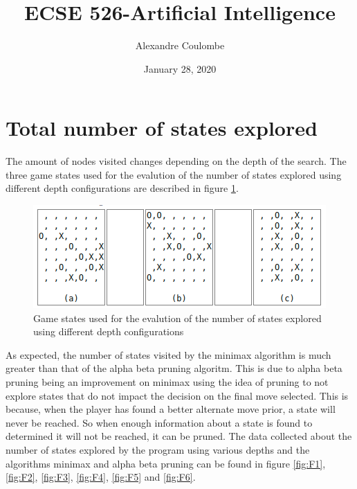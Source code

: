 \documentclass[11pt]{article}
\begin{document}
\title{ECSE 526-Artificial Intelligence}
\author{Alexandre Coulombe}
\date{January 28, 2020}
\maketitle



\section{Total number of states explored}
The amount of nodes visited changes depending on the depth of the search. The three game states used for the evalution of the number of states explored using different depth configurations are described in figure \ref{fig:F0}.
 
\begin{figure}[h]
\centering
\includegraphics[scale=0.5]{Figure_0.png}
\caption{Game states used for the evalution of the number of states explored using different depth configurations}
\label{fig:F0}
\end{figure}

As expected, the number of states visited by the minimax algorithm is much greater than that of the alpha beta pruning algoritm. This is due to alpha beta pruning being an improvement on minimax using the idea of pruning to not explore states that do not impact the decision on the final move selected. This is because, when the player has found a better alternate move prior, a state will never be reached. So when enough information about a state is found to determined it will not be reached, it can be pruned. The data collected about the number of states explored by the program using various depths and the algorithms minimax and alpha beta pruning can be found in figure \ref{fig:F1}, \ref{fig:F2}, \ref{fig:F3}, \ref{fig:F4}, \ref{fig:F5} and \ref{fig:F6}.
\end{document}
